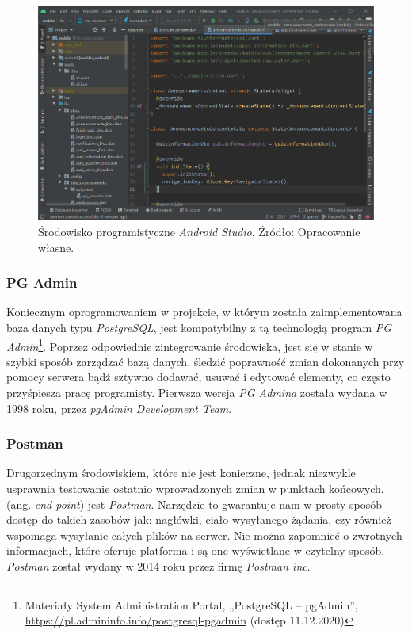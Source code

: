 \documentclass[twoside]{projektInzynierskiMS}
\numberwithin{figure}{section}
\begin{document}
\begin{figure}[h!]
  \centering
  \includegraphics[scale=0.55]{images/androidstudio.png}
    \caption{Środowisko programistyczne \textit{Android Studio}. Źródło: Opracowanie własne.}
    \label{fig:android_studio}
\end{figure}

\subsubsection{PG Admin}
Koniecznym oprogramowaniem w projekcie, w którym została zaimplementowana baza danych typu \textit{PostgreSQL}, jest kompatybilny z tą technologią program \textit{PG Admin}\footnote{Materiały System Administration Portal, „PostgreSQL -- pgAdmin”, \newline
\url{https://pl.admininfo.info/postgresql-pgadmin} (dostęp 11.12.2020)}. Poprzez odpowiednie zintegrowanie środowiska, jest się w stanie w szybki sposób zarządzać bazą danych, śledzić poprawność zmian dokonanych przy pomocy serwera bądź sztywno dodawać, usuwać i edytować elementy, co często przyśpiesza pracę programisty. Pierwsza wersja \textit{PG Admina} została wydana w 1998 roku, przez \textit{pgAdmin Development Team}.

\subsubsection{Postman}
Drugorzędnym środowiskiem, które nie jest konieczne, jednak niezwykle usprawnia testowanie ostatnio wprowadzonych zmian w punktach końcowych, (ang. \textit{end-point}) jest \textit{Postman}. Narzędzie to gwarantuje nam w prosty sposób dostęp do takich zasobów jak: nagłówki, ciało wysyłanego żądania, czy również wspomaga wysyłanie całych plików na serwer. Nie można zapomnieć o zwrotnych informacjach, które oferuje platforma i są one wyświetlane w czytelny sposób. \textit{Postman} został wydany w 2014 roku przez firmę \textit{Postman inc}.
\end{document}

